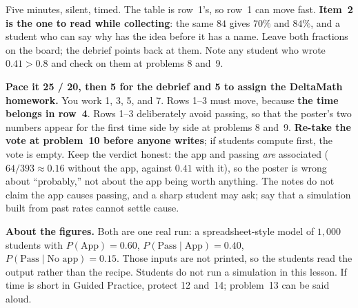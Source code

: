 \documentclass[10pt]{article}
\begin{document}
\begin{teachernote}[Warm-Up]
Five minutes, silent, timed. The table is row~1's, so row~1 can move fast. \textbf{Item~2 is the one
to read while collecting}: the same $84$ gives $70\%$ and $84\%$, and a student who can say why has
the idea before it has a name. Leave both fractions on the board; the debrief points back at them.
Note any student who wrote $0.41 > 0.8$ and check on them at problems 8 and~9.
\end{teachernote}

\begin{teachernote}
\textbf{Pace it 25 / 20, then 5 for the debrief and 5 to assign the DeltaMath homework.} You work 1, 3, 5, and
7. Rows 1--3 must move, because \textbf{the time belongs in row~4}. Rows 1--3 deliberately avoid
passing, so that the poster's two numbers appear for the first time side by side at problems 8
and~9. \textbf{Re-take the vote at problem~10 before anyone writes}; if students compute first, the
vote is empty. Keep the verdict honest: the app and passing \emph{are} associated ($64/393 \approx
0.16$ without the app, against $0.41$ with it), so the poster is wrong about ``probably,'' not about
the app being worth anything. The notes do not claim the app causes passing, and a sharp student may
ask; say that a simulation built from past rates cannot settle cause.

\textbf{About the figures.} Both are one real run: a spreadsheet-style model of $1{,}000$ students with
$P(\text{App}) = 0.60$, $P(\text{Pass} \mid \text{App}) = 0.40$, $P(\text{Pass} \mid \text{No app}) =
0.15$. Those inputs are not printed, so the students read the output rather than the recipe. Students
do not run a simulation in this lesson. If time is short in Guided Practice, protect 12 and~14;
problem~13 can be said aloud.
\end{teachernote}
\end{document}
